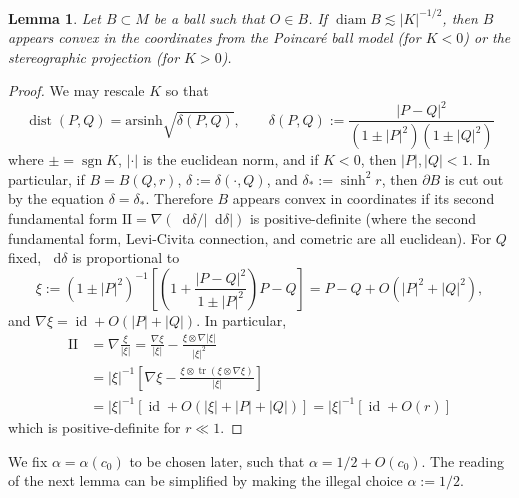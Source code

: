 \documentclass[reqno,10pt]{amsart}
\DeclareMathOperator{\diam}{diam}
\DeclareMathOperator{\id}{id}
\DeclareMathOperator{\sgn}{sgn}
\newcommand{\tr}{\operatorname{tr}}
\newcommand*\dif{\mathop{}\!\mathrm{d}}
\DeclareMathOperator{\dist}{dist}
\newcommand{\Two}{\mathrm{I\!I}}
\newtheorem{lemma}[theorem]{Lemma}
\theoremstyle{definition}
\numberwithin{equation}{section}
\begin{document}
\begin{lemma}\label{convex balls}
Let $B \subset M$ be a ball such that $O \in B$.
If $\diam B \lesssim |K|^{-1/2}$, then $B$ appears convex in the coordinates from the Poincar\'e ball model (for $K < 0$) or the stereographic projection (for $K > 0$).
\end{lemma}
\begin{proof}
We may rescale $K$ so that
$$\dist(P, Q) = \mathrm{arsinh} \sqrt{\delta(P, Q)}, \qquad \delta(P, Q) := \frac{|P - Q|^2}{(1 \pm |P|^2)(1 \pm |Q|^2)}$$
where $\pm = \sgn K$, $|\cdot|$ is the euclidean norm, and if $K < 0$, then $|P|, |Q| < 1$.
In particular, if $B = B(Q, r)$, $\delta := \delta(\cdot, Q)$, and $\delta_* := \sinh^2 r$, then $\partial B$ is cut out by the equation $\delta = \delta_*$.
Therefore $B$ appears convex in coordinates if its second fundamental form $\Two = \nabla(\dif \delta/|\dif \delta|)$ is positive-definite (where the second fundamental form, Levi-Civita connection, and cometric are all euclidean).
For $Q$ fixed, $\dif \delta$ is proportional to 
$$\xi := (1 \pm |P|^2)^{-1} \left[\left(1 + \frac{|P - Q|^2}{1 \pm |P|^2}\right)P - Q\right] = P - Q + O(|P|^2 + |Q|^2),$$
and $\nabla \xi = \id + O(|P| + |Q|)$.
In particular,
\begin{align*}
\Two &= \nabla\frac{\xi}{|\xi|} = \frac{\nabla \xi}{|\xi|} - \frac{\xi \otimes \nabla|\xi|}{|\xi|^2} \\
&= |\xi|^{-1} \left[\nabla \xi - \frac{\xi \otimes \tr(\xi \otimes \nabla \xi)}{|\xi|}\right] \\
&= |\xi|^{-1} [\id + O(|\xi| + |P| + |Q|)] = |\xi|^{-1} [\id + O(r)]
\end{align*}
which is positive-definite for $r \ll 1$.
\end{proof}

We fix $\alpha = \alpha(c_0)$ to be chosen later, such that $\alpha = 1/2 + O(c_0)$.
The reading of the next lemma can be simplified by making the illegal choice $\alpha := 1/2$.
\end{document}

